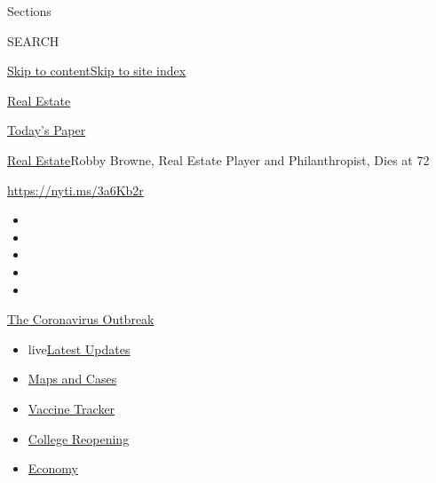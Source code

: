 Sections

SEARCH

\protect\hyperlink{site-content}{Skip to
content}\protect\hyperlink{site-index}{Skip to site index}

\href{https://www.nytimes.com/section/realestate}{Real Estate}

\href{https://myaccount.nytimes.com/auth/login?response_type=cookie\&client_id=vi}{}

\href{https://www.nytimes.com/section/todayspaper}{Today's Paper}

\href{/section/realestate}{Real Estate}\textbar{}Robby Browne, Real
Estate Player and Philanthropist, Dies at 72

\url{https://nyti.ms/3a6Kb2r}

\begin{itemize}
\item
\item
\item
\item
\item
\end{itemize}

\href{https://www.nytimes.com/news-event/coronavirus?action=click\&pgtype=Article\&state=default\&region=TOP_BANNER\&context=storylines_menu}{The
Coronavirus Outbreak}

\begin{itemize}
\tightlist
\item
  live\href{https://www.nytimes.com/2020/08/03/world/coronavirus-covid-19.html?action=click\&pgtype=Article\&state=default\&region=TOP_BANNER\&context=storylines_menu}{Latest
  Updates}
\item
  \href{https://www.nytimes.com/interactive/2020/us/coronavirus-us-cases.html?action=click\&pgtype=Article\&state=default\&region=TOP_BANNER\&context=storylines_menu}{Maps
  and Cases}
\item
  \href{https://www.nytimes.com/interactive/2020/science/coronavirus-vaccine-tracker.html?action=click\&pgtype=Article\&state=default\&region=TOP_BANNER\&context=storylines_menu}{Vaccine
  Tracker}
\item
  \href{https://www.nytimes.com/2020/08/02/us/covid-college-reopening.html?action=click\&pgtype=Article\&state=default\&region=TOP_BANNER\&context=storylines_menu}{College
  Reopening}
\item
  \href{https://www.nytimes.com/live/2020/08/03/business/stock-market-today-coronavirus?action=click\&pgtype=Article\&state=default\&region=TOP_BANNER\&context=storylines_menu}{Economy}
\end{itemize}

